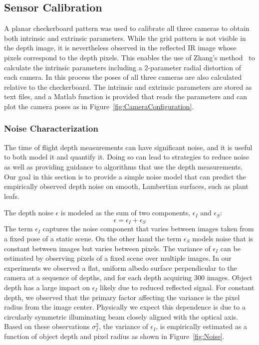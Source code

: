 

\subsection{Sensor Calibration}

A planar checkerboard pattern was used to calibrate all three cameras to obtain both intrinsic and extrinsic parameters.  While the grid pattern is not visible in the depth image, it is nevertheless observed in the reflected IR image whose pixels correspond to the depth pixels.  This enables the use of Zhang's method~\cite{Zhang2000} to calculate the intrinsic parameters including a $2$-parameter radial distortion of each camera.  In this process the poses of all three cameras are also calculated relative to the checkerboard.  The intrinsic and extrinsic parameters are stored as text files, and a Matlab function is provided that reads the parameters and can plot the camera poses as in Figure~\ref{fig:CameraConfiguration}.


\subsubsection{Noise Characterization}
\label{sec:bias}

The time of flight depth measurements can have significant noise, and it is useful to both model it and quantify it.  Doing so can lead to strategies to reduce noise as well as providing guidance to algorithms that use the depth measurements.  Our goal in this section is to provide a simple noise model that can predict the empirically observed depth noise on smooth, Lambertian surfaces, such as plant leafs.  

The depth noise $\epsilon$ is modeled as the sum of two components, $\epsilon_I$ and $\epsilon_S$: 
\begin{equation}
	\epsilon = \epsilon_I + \epsilon_S\label{eq:epsilon}
\end{equation}
The term $\epsilon_I$ captures the noise component that varies between images taken from a fixed pose of a static scene. On the other hand the term $\epsilon_S$ models noise that is constant between images but varies between pixels. The variance of $\epsilon_I$ can be estimated by observing pixels of a fixed scene over multiple images.  In our experiments we observed a flat, uniform albedo surface perpendicular to the camera at a sequence of depths, and for each depth acquiring 300 images.  Object depth has a large impact on $\epsilon_I$ likely due to reduced reflected signal.  For constant depth, we observed that the primary factor affecting the variance is the pixel radius from the image center.  Physically we expect this dependence is due to a circularly symmetric illuminating beam closely aligned with the optical axis.  Based on these observations $\sigma_I^2$, the variance of $\epsilon_I$, is empirically estimated as a function of object depth and pixel radius as shown in Figure~\ref{fig:Noise}.  

